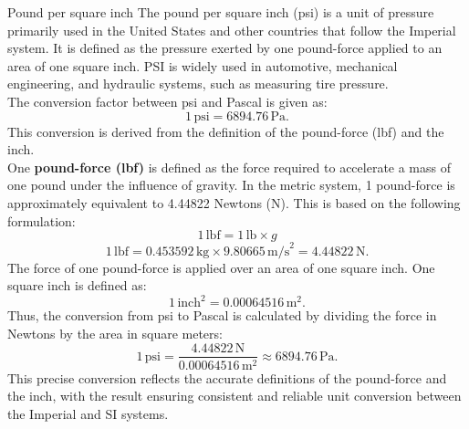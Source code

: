 \documentclass{article}
\begin{document}
\begin{briefillus}{Pound per square inch}{}
	The pound per square inch (psi) is a unit of pressure primarily used in the United States and other countries that follow the Imperial system. It is defined as the pressure exerted by one pound-force applied to an area of one square inch. PSI is widely used in automotive, mechanical engineering, and hydraulic systems, such as measuring tire pressure.\\[8pt]
	The conversion factor between psi and Pascal is given as:
	\[1 \, \text{psi} = 6894.76 \, \text{Pa}.\]
	This conversion is derived from the definition of the pound-force (lbf) and the inch.\\
	One \textbf{pound-force (lbf)} is defined as the force required to accelerate a mass of one pound under the influence of gravity. In the metric system, 1 pound-force is approximately equivalent to 4.44822 Newtons (N). This is based on the following formulation:
	\[1\,\text{lbf}=1\,\text{lb}\times g\]
	\[1 \, \text{lbf} = 0.453592 \, \text{kg} \times 9.80665 \, \text{m/s}^2 = 4.44822 \, \text{N}.\]
	The force of one pound-force is applied over an area of one square inch. One square inch is defined as:
	\[1 \, \text{inch}^2 = 0.00064516 \, \text{m}^2.\]
	Thus, the conversion from psi to Pascal is calculated by dividing the force in Newtons by the area in square meters:
	\[1 \, \text{psi} = \frac{4.44822 \, \text{N}}{0.00064516 \, \text{m}^2} \approx 6894.76 \, \text{Pa}.\]
	This precise conversion reflects the accurate definitions of the pound-force and the inch, with the result ensuring consistent and reliable unit conversion between the Imperial and SI systems.
\end{briefillus}
\end{document}

